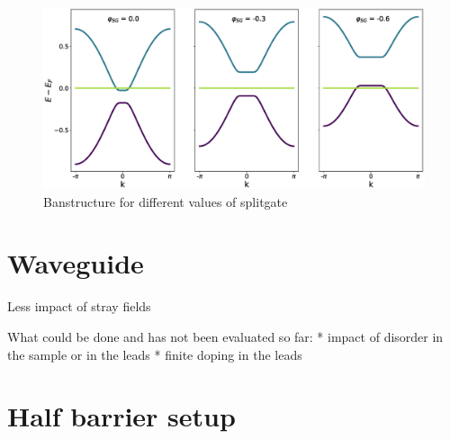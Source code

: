 \documentclass[a4paper]{article}
\begin{document}
\begin{figure}
\centering
\includegraphics[width=\textwidth]{bands-transition}
\caption{Banstructure for different values of splitgate}
\end{figure}

\section{Waveguide}

Less impact of stray fields

What could be done and has not been evaluated so far:
* impact of disorder in the sample or in the leads
* finite doping in the leads


\section{Half barrier setup}
\end{document}
